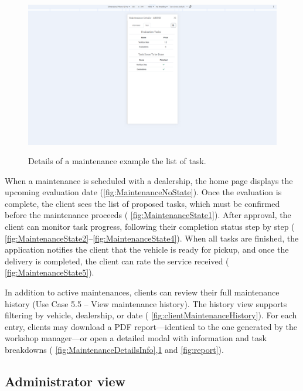 \begin{figure}[h]
  \caption{Details of a maintenance example the list of task.}
  \centering
  \includegraphics[width=\textwidth]{figs/Implementation/client/MaintenanceDetailsTasks}
  \label{fig:MaintenanceDetailsTasks}
\end{figure}


When a maintenance is scheduled with a dealership, the home page displays the upcoming evaluation date (\ref{fig:MaintenanceNoState}). Once the evaluation is complete, the client sees the list of proposed tasks, which must be confirmed before the maintenance proceeds ( \ref{fig:MaintenanceState1}). After approval, the client can monitor task progress, following their completion status step by step ( \ref{fig:MaintenanceState2}–\ref{fig:MaintenanceState4}). When all tasks are finished, the application notifies the client that the vehicle is ready for pickup, and once the delivery is completed, the client can rate the service received ( \ref{fig:MaintenanceState5}).

In addition to active maintenances, clients can review their full maintenance history (Use Case 5.5 – View maintenance history). The history view supports filtering by vehicle, dealership, or date ( \ref{fig:clientMaintenanceHistory}). For each entry, clients may download a PDF report—identical to the one generated by the workshop manager—or open a detailed modal with information and task breakdowns ( \ref{fig:MaintenanceDetailsInfo},\ref{fig:MaintenanceDetailsTasks} and \ref{fig:report}).



\subsection{Administrator view}


